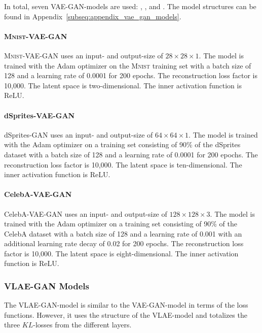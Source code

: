 In total, seven \ac{VAE}-\ac{GAN}-models are used: , , and .
The model structures can be found in Appendix~\ref{subseq:appendix_vae_gan_models}.

\paragraph{\textsc{Mnist}-\ac{VAE}-\ac{GAN}} \textsc{Mnist}-\ac{VAE}-\ac{GAN} uses an input- and output-size of $28\times 28\times 1$.
The model is trained with the Adam optimizer on the \textsc{Mnist} training set with a batch size of 128 and a learning rate of 0.0001 for 200 epochs.
The reconstruction loss factor is 10,000.
The latent space is two-dimensional.
The inner activation function is ReLU.

\paragraph{dSprites-\ac{VAE}-\ac{GAN}} dSprites-\ac{GAN} uses an input- and output-size of $64\times 64\times 1$.
The model is trained with the Adam optimizer on a training set consisting of 90\% of the dSprites dataset with a batch size of 128 and a learning rate of 0.0001 for 200 epochs.
The reconstruction loss factor is 10,000.
The latent space is ten-dimensional.
The inner activation function is ReLU.

\paragraph{CelebA-\ac{VAE}-\ac{GAN}} CelebA-\ac{VAE}-\ac{GAN} uses an input- and output-size of $128\times 128\times 3$.
The model is trained with the Adam optimizer on a training set consisting of 90\% of the CelebA dataset with a batch size of 128 and a learning rate of 0.001 with an additional learning rate decay of 0.02 for 200 epochs.
The reconstruction loss factor is 10,000.
The latent space is eight-dimensional.
The inner activation function is ReLU.

\subsubsection{VLAE-GAN Models}\label{subsubsec:vlae_gan_models}

The \ac{VLAE}-\ac{GAN}-model is similar to the \ac{VAE}-\ac{GAN}-model in terms of the loss functions.
However, it uses the structure of the \ac{VLAE}-model and totalizes the three $KL$-losses from the different layers.

